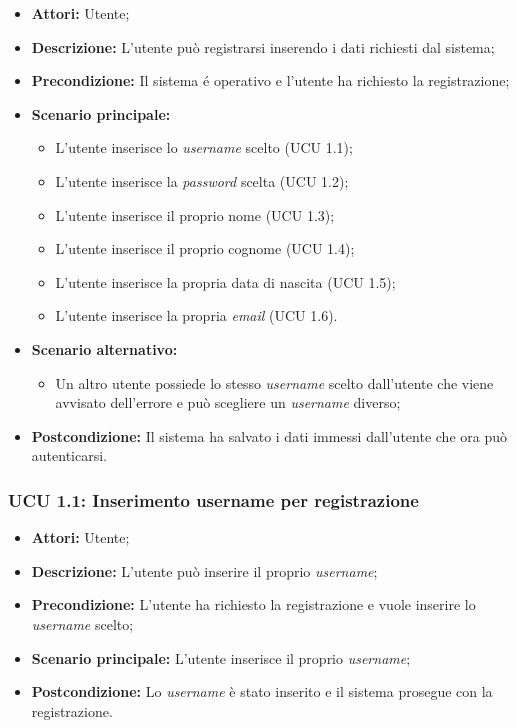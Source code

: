 \begin{itemize}
	\item \textbf{Attori:} Utente;
	\item \textbf{Descrizione:} L'utente può registrarsi inserendo i dati richiesti dal sistema;
	\item \textbf{Precondizione:} Il sistema é operativo e l'utente ha richiesto la registrazione;
	\item \textbf{Scenario principale:}
	\begin{itemize}
		\item L'utente inserisce lo \textit{username} scelto (UCU 1.1);
		\item L'utente inserisce la \textit{password} scelta (UCU 1.2);
		\item L'utente inserisce il proprio nome (UCU 1.3);
		\item L'utente inserisce il proprio cognome (UCU 1.4);
		\item L'utente inserisce la propria data di nascita (UCU 1.5);
		\item L'utente inserisce la propria \textit{email} (UCU 1.6).
	\end{itemize}
	\item \textbf{Scenario alternativo:}
	\begin{itemize}
		\item Un altro utente possiede lo stesso \textit{username} scelto dall'utente che viene avvisato dell'errore e può scegliere un \textit{username} diverso;
	\end{itemize}
	\item \textbf{Postcondizione:} Il sistema ha salvato i dati immessi dall'utente che ora può autenticarsi.
\end{itemize}

\hypertarget{U1.1}{}
\subsubsection{UCU 1.1: Inserimento username per registrazione}
\begin{itemize}
	\item \textbf{Attori:} Utente;
	\item \textbf{Descrizione:} L'utente può inserire il proprio \textit{username};
	\item \textbf{Precondizione:} L'utente ha richiesto la registrazione e vuole inserire lo \textit{username} scelto;
	\item \textbf{Scenario principale:} L'utente inserisce il proprio \textit{username};
	\item \textbf{Postcondizione:} Lo \textit{username} è stato inserito e il sistema prosegue con la registrazione.
\end{itemize}

